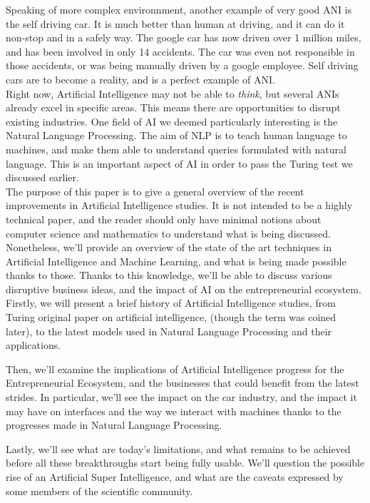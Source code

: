 \documentclass[12pt]{article}
\begin{document}
Speaking of more complex environnment, another example of very good \gls{ANI} is
the self driving car. It is much better than human at driving, and it can do it
non-stop and in a safely way. The google car has now driven over 1 million
miles, and has been involved in only 14 accidents. The car was even not
responsible in those accidents, or was being manually driven by a google
employee. Self driving cars are to become a reality, and is a perfect example of
\gls{ANI}. \\

Right now, Artificial Intelligence may not be able to {\em think}, but several
ANIs already excel in specific areas. This means there are opportunities to
disrupt existing industries. One field of AI we deemed particularly interesting
is the Natural Language Processing. The aim of NLP is to teach human language to
machines, and make them able to understand queries formulated with natural
language. This is an important aspect of AI in order to pass the Turing test we
discussed earlier. \\

The purpose of this paper is to give a general overview of the recent
improvements in Artificial Intelligence studies. It is not intended to be a
highly technical paper, and the reader should only have minimal notions about
computer science and mathematics to understand what is being discussed.
Nonetheless, we'll provide an overview of the state of the art techniques in
Artificial Intelligence and Machine Learning, and what is being made possible
thanks to those. Thanks to this knowledge, we'll be able to discuss various
disruptive business ideas, and the impact of AI on the entrepreneurial
ecosystem. \\

Firstly, we will present a brief history of Artificial Intelligence studies, from
Turing original paper on artificial intelligence, (though the term was coined
later), to the latest models used in Natural Language Processing and their
applications.

\noindent Then, we'll examine the implications of Artificial Intelligence
progress for the Entrepreneurial Ecosystem, and the businesses that could benefit
from the latest strides. In particular, we'll see the impact on the car
industry, and the impact it may have on interfaces and the way we interact with
machines thanks to the progresses made in Natural Language Processing.

\noindent Lastly, we'll see what are today's limitations, and what remains to be
achieved before all these breakthroughs start being fully usable. We'll question
the possible rise of an Artificial Super Intelligence, and what are the caveats
expressed by some members of the scientific community.
\end{document}
